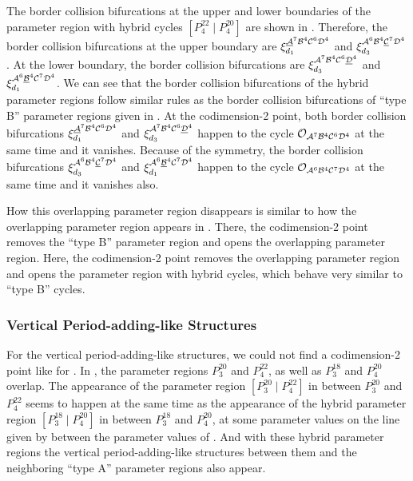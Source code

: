 The border collision bifurcations at the upper and lower boundaries of the parameter region with hybrid cycles $\left[P^{22}_4 \mid P^{20}_4\right]$ are shown in .
Therefore, the border collision bifurcations at the upper boundary are $\xi_{d_1}^{\underline{\mathcal{A}}^7\mathcal{B}^4\mathcal{C}^6\mathcal{D}^4}$ and $\xi_{d_3}^{\mathcal{A}^6\mathcal{B}^4\underline{\mathcal{C}}^7\mathcal{D}^4}$.
At the lower boundary, the border collision bifurcations are $\xi_{d_3}^{\mathcal{A}^7\mathcal{B}^4\mathcal{C}^6\underline{\mathcal{D}}^4}$ and $\xi_{d_1}^{\mathcal{A}^6\underline{\mathcal{B}}^4\mathcal{C}^7\mathcal{D}^4}$.
We can see that the border collision bifurcations of the hybrid parameter regions follow similar rules as the border collision bifurcations of ``type B'' parameter regions given in .
At the codimension-2 point, both border collision bifurcations $\xi_{d_1}^{\underline{\mathcal{A}}^7\mathcal{B}^4\mathcal{C}^6\mathcal{D}^4}$ and $\xi_{d_3}^{\mathcal{A}^7\mathcal{B}^4\mathcal{C}^6\underline{\mathcal{D}}^4}$ happen to the cycle $\mathcal{O}_{\mathcal{A}^7\mathcal{B}^4\mathcal{C}^6\mathcal{D}^4}$ at the same time and it vanishes.
Because of the symmetry, the border collision bifurcations $\xi_{d_3}^{\mathcal{A}^6\mathcal{B}^4\underline{\mathcal{C}}^7\mathcal{D}^4}$ and $\xi_{d_1}^{\mathcal{A}^6\underline{\mathcal{B}}^4\mathcal{C}^7\mathcal{D}^4}$ happen to the cycle $\mathcal{O}_{\mathcal{A}^6\mathcal{B}^4\mathcal{C}^7\mathcal{D}^4}$ at the same time and it vanishes also.

How this overlapping parameter region disappears is similar to how the overlapping parameter region appears in .
There, the codimension-2 point removes the ``type B'' parameter region and opens the overlapping parameter region.
Here, the codimension-2 point removes the overlapping parameter region and opens the parameter region with hybrid cycles, which behave very similar to ``type B'' cycles.

\subsubsection{Vertical Period-adding-like Structures}
\label{sec:add.change.appa.vert}

For the vertical period-adding-like structures, we could not find a codimension-2 point like for .
In , the parameter regions $P^{20}_3$ and $P^{22}_4$, as well as $P^{18}_3$ and $P^{20}_4$ overlap.
The appearance of the parameter region $\left[P^{20}_3 \mid P^{22}_4\right]$ in between $P^{20}_3$ and $P^{22}_4$ seems to happen at the same time as the appearance of the hybrid parameter region $\left[P^{18}_3 \mid P^{20}_4\right]$ in between $P^{18}_3$ and $P^{20}_4$, at some parameter values on the line given by  between the parameter values of .
And with these hybrid parameter regions the vertical period-adding-like structures between them and the neighboring ``type A'' parameter regions also appear.

